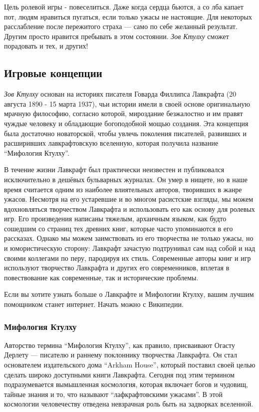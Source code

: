 \documentclass[letterpaper,twocolumn,openany, twoside, 11pt, usenames]{cocbook}
\begin{document}
Цель ролевой игры - повеселиться. Даже когда сердца бьются, а со лба капает пот, людям нравиться пугаться, если только ужасы не настоящие. Для некоторых расслабление после пережитого страха --- само по себе желанный результат. Другим просто нравится пребывать в этом состоянии. {\it Зов Ктулху} сможет порадовать и тех, и других!

\subsection*{\nohyphens{Игровые концепции}}

{\it Зов Ктулху} основан на историях писателя Говарда Филлипса Лавкрафта (20 августа 1890 - 15 марта 1937), чьи истории имели в своей основе оригинальную мрачную философию, согласно которой, мироздание безжалостно и им правят чуждые  человеку и обладающие богоподобной мощью создания. Эта концепция была достаточно новаторской, чтобы увлечь поколения писателей, развивших и расширивших лавкрафтовскую вселенную, которая получила название ``Мифология Ктулху''.

В течение жизни Лавкрафт был практически неизвестен и публиковался исключительно в дешёвых бульварных журналах. Он умер в нищете, но в наше время считается одним из наиболее влиятельных авторов, творивших в жанре ужасов. Несмотря на его устаревшие и во многом расистские взгляды, мы можем вдохновляться творчеством Лавкрафта и использовать его как основу для ролевых игр. Его произведения написаны тяжелым, архаичным языком, как будто сошедшим со страниц тех древних книг, которые часто упоминаются в его рассказах. Однако мы можем заимствовать из его творчества не только ужасы, но и юмористическую сторону: Лавкрафт зачастую подтрунивал сам над собой и над своими коллегами по перу, пародируя их стиль. Современные авторы книг и игр используют творчество Лавкрафта и других его современников, вплетая в повествование как современные, так и исторические проблемы.

Если вы хотите узнать больше о Лавкрафте и Мифологии Ктулху, вашим лучшим помощником станет интернет. Начать можно с Википедии.

\subsubsection*{\nohyphens{Мифология Ктулху}}

Авторство термина ``Мифология Ктулху'', как правило, присваивают Огасту Дерлету --- писателю и раннему поклоннику творчества Лавкрафта. Он стал основателем издательского дома ``Arkham House'', который поставил своей целью сделать широко доступными книги Лавкрафта. Сегодня под этим термином подразумевается вымышленная космология, которая включает богов и чудовищ, тайные знания и то, что называют ``лафкрафтовскими ужасами''. В этой космологии человечеству отведена невзрачная роль быть на задворках вселенной.
\end{document}
